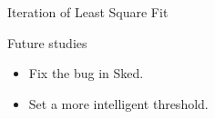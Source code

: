 \documentclass{beamer}
\begin{document}
    \begin{frame}{Iteration of Least Square Fit}
        \begin{figure}[htp] %
        \centering
        \hfil

        \hfil
        \end{figure}
    \end{frame}
    \begin{frame}{Future studies}
        \begin{itemize}[<+-|alert@+>]
            \item Fix the bug in Sked.
            \item Set a more intelligent threshold.
        \end{itemize}
    \end{frame}
\end{document}
